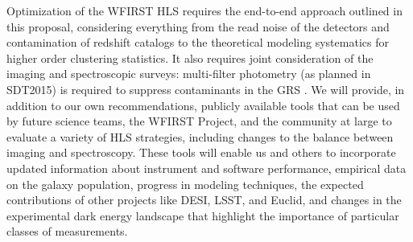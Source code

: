   Optimization of the WFIRST HLS requires the end-to-end approach
outlined in this proposal, considering everything from the read noise
of the detectors and contamination of redshift catalogs to the
theoretical modeling systematics for higher order clustering statistics.
It also requires joint consideration of the imaging and spectroscopic
surveys:
multi-filter photometry (as planned in SDT2015) is required to suppress
contaminants in the GRS \cite{Pullen2015}.
We will provide, in addition to our own recommendations,
publicly available tools that can be used by future science teams,
the WFIRST Project, and the community at large to evaluate a variety
of HLS strategies, including changes to the balance between imaging
and spectroscopy.  These tools will enable us and others to incorporate
updated information about instrument and software performance,
empirical data on the galaxy population, progress in modeling techniques,
the expected contributions of other projects like DESI, LSST, and Euclid,
and changes in the experimental dark energy landscape that highlight
the importance of particular classes of measurements.

